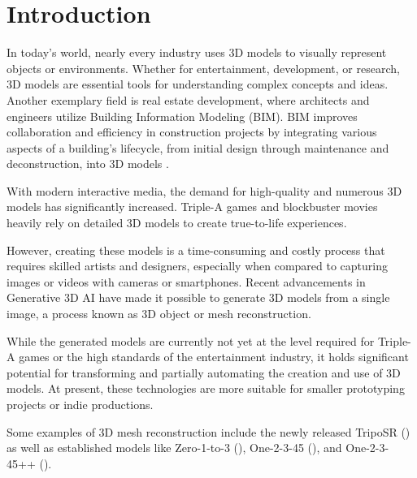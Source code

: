 

\section{Introduction}
\label{section:Introduction}
In today's world, nearly every industry uses 3D models to visually represent objects or environments. Whether for entertainment, development, or research, 3D models are essential tools for understanding complex concepts and ideas.
Another exemplary field is real estate development, where architects and engineers utilize Building Information Modeling (BIM). BIM improves collaboration and efficiency in construction projects by integrating various aspects of a building's lifecycle, from initial design through maintenance and deconstruction, into 3D models \autocite{azhar_building_2020}.


With modern interactive media, the demand for high-quality and numerous 3D models has significantly increased. Triple-A games and blockbuster movies heavily rely on detailed 3D models to create true-to-life experiences.

However, creating these models is a time-consuming and costly process that requires skilled artists and designers, especially when compared to capturing images or videos with cameras or smartphones. Recent advancements in Generative 3D AI have made it possible to generate 3D models from a single image, a process known as 3D object or mesh reconstruction.

While the generated models are currently not yet at the level required for Triple-A games or the high standards of the entertainment industry, it holds significant potential for transforming and partially automating the creation and use of 3D models. At present, these technologies are more suitable for smaller prototyping projects or indie productions.

Some examples of 3D mesh reconstruction include the newly released TripoSR (\textcite{tochilkin_triposr_2024}) as well as established models like Zero-1-to-3 (\textcite{liu_zero-1--3_2023}), One-2-3-45 (\textcite{liu_one-2-3-45_2023}), and One-2-3-45++ (\textcite{liu_one-2-3-45_2024}).

